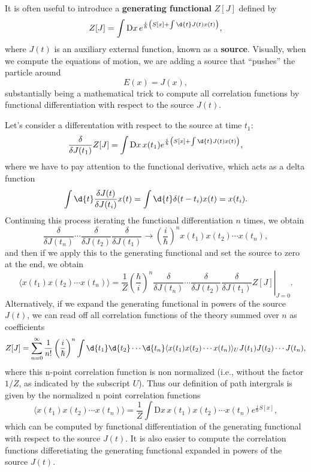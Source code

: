 It is often useful to introduce a \textbf{generating functional} \(Z[J]\) defined by
\begin{equation}
    Z[J] = \int \mathrm{D} x \, e^{\frac{i}{\hbar} \left(S[x] + \int \d{t} J(t) x(t)\right)},
    \label{eq:generating_functional}
\end{equation}
where \(J(t)\) is an auxiliary external function, known as a \textbf{source}.
Visually, when we compute the equations of motion, we are adding a source that ``pushes'' the particle around
\[
    E(x) = J(x),
\]
substantially being a mathematical trick to compute all correlation functions by functional differentiation with respect to the source \(J(t)\).

Let's consider a differentation with respect to the source at time \(t_1\):
\[
    \frac{\delta}{\delta J(t_1)} Z[J] = \int \mathrm{D} x \, x(t_1) e^{\frac{i}{\hbar} \left(S[x] + \int \d{t} J(t) x(t)\right)},
\]
where we have to pay attention to the functional derivative, which acts as a delta function
\begin{equation}
    \int \d{t} \frac{\delta J(t)}{\delta J(t_i)} x(t) = \int \d{t} \delta(t - t_i) x(t) = x(t_i).
    \label{eq:functional_derivative}
\end{equation}
Continuing this process iterating the functional differentiation \(n\) times, we obtain
\[
    \frac{\delta}{\delta J(t_n)} \cdots \frac{\delta}{\delta J(t_2)} \frac{\delta}{\delta J(t_1)} \to \left(\frac{i}{\hbar}\right)^n x(t_1)x(t_2)\cdots x(t_n),
\]
and then if we apply this to the generating functional and set the source to zero at the end, we obtain
\[
    \langle x(t_1)x(t_2)\cdots x(t_n) \rangle = \left. \frac{1}{Z} \left(\frac{\hbar}{i}\right)^n \frac{\delta}{\delta J(t_n)} \cdots \frac{\delta}{\delta J(t_2)} \frac{\delta}{\delta J(t_1)} Z[J] \right|_{J=0}.
\]
Alternatively, if we expand the generating functional in powers of the source \(J(t)\), we can read off all correlation functions of the theory summed over \(n\) as coefficients
\[
    Z[J] = \sum_{n=0}^{\infty} \frac{1}{n!} \left(\frac{i}{\hbar}\right)^n \int \d{t_1} \d{t_2} \cdots \d{t_n} \langle x(t_1)x(t_2)\cdots x(t_n) \rangle_U J(t_1) J(t_2) \cdots J(t_n),
\]
where this n-point correlation function is non normalized (i.e., without the factor \(1/Z\), as indicated by the subscript \(U\)). Thus our definition of path intergrals is given by the normalized n point correlation functions
\[
    \langle x(t_1)x(t_2)\cdots x(t_n) \rangle = \frac{1}{Z} \int \mathrm{D} x \, x(t_1)x(t_2)\cdots x(t_n) e^{\frac{i}{\hbar}S[x]},
\]
which can be computed by functional differentiation of the generating functional with respect to the source \(J(t)\). It is also easier to compute the correlation functions differetiating the generating functional expanded in powers of the source \(J(t)\).


